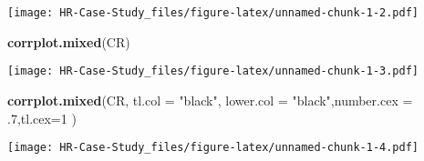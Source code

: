 \documentclass[
]{article}
\newenvironment{Shaded}{\begin{snugshade}}{\end{snugshade}}
\newcommand{\DataTypeTok}[1]{\textcolor[rgb]{0.13,0.29,0.53}{#1}}
\newcommand{\DecValTok}[1]{\textcolor[rgb]{0.00,0.00,0.81}{#1}}
\newcommand{\FloatTok}[1]{\textcolor[rgb]{0.00,0.00,0.81}{#1}}
\newcommand{\KeywordTok}[1]{\textcolor[rgb]{0.13,0.29,0.53}{\textbf{#1}}}
\newcommand{\NormalTok}[1]{#1}
\newcommand{\StringTok}[1]{\textcolor[rgb]{0.31,0.60,0.02}{#1}}
\begin{document}
\texttt{[image: HR-Case-Study\_files/figure-latex/unnamed-chunk-1-2.pdf]}

\begin{Shaded}
\begin{Highlighting}[]
\KeywordTok{corrplot.mixed}\NormalTok{(CR)}
\end{Highlighting}
\end{Shaded}

\texttt{[image: HR-Case-Study\_files/figure-latex/unnamed-chunk-1-3.pdf]}

\begin{Shaded}
\begin{Highlighting}[]
\KeywordTok{corrplot.mixed}\NormalTok{(CR,  }\DataTypeTok{tl.col =} \StringTok{"black"}\NormalTok{, }\DataTypeTok{lower.col =} \StringTok{"black"}\NormalTok{,}\DataTypeTok{number.cex =} \FloatTok{.7}\NormalTok{,}\DataTypeTok{tl.cex=}\DecValTok{1}\NormalTok{ )}
\end{Highlighting}
\end{Shaded}

\texttt{[image: HR-Case-Study\_files/figure-latex/unnamed-chunk-1-4.pdf]}
\end{document}
